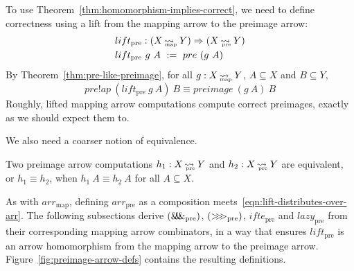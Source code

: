 \documentclass[preprint]{sigplanconf}
\newcommand{\arrow}{\rightsquigarrow}
\newcommand{\arrowlift}{\ensuremath{lift}}
\newcommand{\arrowarr}{\ensuremath{arr}}
\newcommand{\arrowcomp}{\ensuremath{{>}\mspace{-6mu}{>}\mspace{-6mu}{>}}}
\newcommand{\arrowpair}{\ensuremath{\mathit{\&\mspace{-7.5mu}\&\mspace{-7.5mu}\&}}}
\newcommand{\arrowif}{\ensuremath{ifte}}
\newcommand{\arrowlazy}{\ensuremath{lazy}}
\newcommand{\map}{_\mathrm{map}}
\DeclareMathOperator{\mapto}{\arrow_{\mspace{-21mu}\map}}
\newcommand{\arrmap}{\arrowarr\map}
\newcommand{\pre}{_\mathrm{pre}}
\DeclareMathOperator{\preto}{\arrow_{\mspace{-19mu}\pre}}
\newcommand{\liftpre}{\arrowlift\pre}
\newcommand{\arrpre}{\arrowarr\pre}
\newcommand{\comppre}{\arrowcomp\pre}
\newcommand{\pairpre}{\arrowpair\pre}
\newcommand{\ifpre}{\arrowif\pre}
\newcommand{\lazypre}{\arrowlazy\pre}
\begin{document}
To use Theorem~\ref{thm:homomorphism-implies-correct}, we need to define correctness using a lift from the mapping arrow to the preimage arrow:
\begin{equation}
\begin{aligned}
	&\liftpre : (X \mapto Y) \tto (X \preto Y) \\
	&\liftpre~g~A \ := \ pre~(g~A)
\end{aligned}
\end{equation}
By Theorem~\ref{thm:pre-like-preimage}, for all $g : X \mapto Y$, $A \subseteq X$ and $B \subseteq Y$,
\begin{equation}
	pre!ap~(\liftpre~g~A)~B \equiv preimage~(g~A)~B
\end{equation}
Roughly, lifted mapping arrow computations compute correct preimages, exactly as we should expect them to.

We also need a coarser notion of equivalence.

\begin{definition}
Two preimage arrow computations $h_1 : X \preto Y$ and $h_2 : X \preto Y$ are equivalent, or $h_1 \equiv h_2$, when 
$h_1~A \equiv h_2~A$ for all $A \subseteq X$.
\end{definition}

As with $\arrmap$, defining $\arrpre$ as a composition meets~\eqref{eqn:lift-distributes-over-arr}.
The following subsections derive $(\pairpre)$, $(\comppre)$, $\ifpre$ and $\lazypre$ from their corresponding mapping arrow combinators, in a way that ensures $\liftpre$ is an arrow homomorphism from the mapping arrow to the preimage arrow. Figure~\ref{fig:preimage-arrow-defs} contains the resulting definitions.
\end{document}
